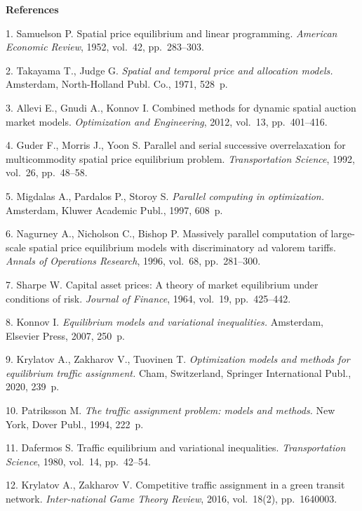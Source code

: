 

{\small



\vskip6mm

\noindent \textbf{References} }

\vskip 2mm

{\footnotesize



1. {Samuelson P.} Spatial price equilibrium and linear
programming. {\it American Economic Review}, 1952, vol.~42,
pp.~283--303.

2. {Takayama T., Judge G.} \textit{Spatial and temporal price and
allocation models.} Amsterdam, North-Holland Publ. Co., 1971,
528~p.

3. {Allevi E., Gnudi A., Konnov I.} Combined methods for dynamic
spatial auction market models. {\it Optimization and Engineering},
2012, vol.~13, pp.~401--416.

4. {Guder F., Morris J., Yoon S.} Parallel and serial successive
overrelaxation for multicommodity spatial price equilibrium
problem. {\it Transportation Science}, 1992, vol.~26, pp.~48--58.

5. {Migdalas A., Pardalos P., Storoy S.} \textit{Parallel
computing in optimization.} Amsterdam, Kluwer Academic Publ.,
1997, 608~p.

6. {Nagurney A., Nicholson C., Bishop P.} Massively parallel
computation of large-scale spatial price equilibrium models with
discriminatory ad valorem tariffs. {\it Annals of Operations
Research}, 1996, vol.~68, pp.~281--300.

7. {Sharpe W.} Capital asset prices: A theory of market
equilibrium under conditions of risk. {\it Journal of Finance},
1964, vol.~19, pp.~425--442.

8. {Konnov I.} \textit{Equilibrium models and variational
inequalities.} Amsterdam, Elsevier Press, 2007, 250~p.

9. {Krylatov A., Zakharov V., Tuovinen T.} \textit{Optimization
models and methods for equilibrium traffic assignment.} Cham,
Switzerland, Springer International Publ., 2020, 239~p.

10. {Patriksson M.} \textit{The traffic assignment problem: models
and methods.} New York, Dover Publ., 1994, 222~p.

11. {Dafermos S.} Traffic equilibrium and variational
inequalities. {\it Transportation Science}, 1980, vol.~14,
pp.~42--54.

12. {Krylatov A., Zakharov V.} Competitive traffic assignment in a
green transit network. {\it Inter-national Game Theory Review},
2016, vol.~18(2), pp.~1640003.

}
